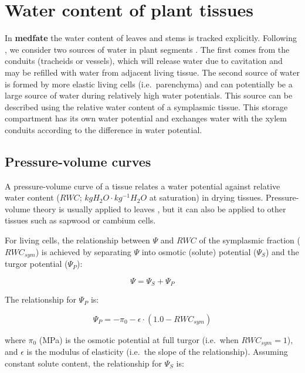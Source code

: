 \documentclass[]{book}
\begin{document}
\section{Water content of plant
tissues}\label{water-content-of-plant-tissues}

In \textbf{medfate} the water content of leaves and stems is tracked
explicitly. Following \citet{Martin-StPaul2017}, we consider two sources
of water in plant segments \citep{Tyree1990}. The first comes from the
conduits (tracheids or vessels), which will release water due to
cavitation and may be refilled with water from adjacent living tissue.
The second source of water is formed by more elastic living cells
(i.e.~parenchyma) and can potentially be a large source of water during
relatively high water potentials. This source can be described using the
relative water content of a symplasmic tissue. This storage compartment
has its own water potential and exchanges water with the xylem conduits
according to the difference in water potential.

\subsection{Pressure-volume curves}\label{pressure-volume-curves}

A pressure-volume curve of a tissue relates a water potential against
relative water content (\(RWC\); \(kg H_2O \cdot kg^{-1}H_2O\) at
saturation) in drying tissues. Pressure-volume theory is usually applied
to leaves \citep{Bartlett2012}, but it can also be applied to other
tissues such as sapwood or cambium cells.

For living cells, the relationship between \(\Psi\) and \(RWC\) of the
symplasmic fraction (\(RWC_{sym}\)) is achieved by separating \(\Psi\)
into osmotic (solute) potential (\(\Psi_{S}\)) and the turgor potential
(\(\Psi_{P}\)):

\begin{equation}
\Psi = \Psi_{S} + \Psi_{P}
\end{equation}

The relationship for \(\Psi_{P}\) is:

\begin{equation}
\Psi_{P} = -\pi_0 -\epsilon\cdot (1.0 - RWC_{sym})
\end{equation}

where \(\pi_0\) (MPa) is the osmotic potential at full turgor (i.e.~when
\(RWC_{sym} = 1\)), and \(\epsilon\) is the modulus of elasticity
(i.e.~the slope of the relationship). Assuming constant solute content,
the relationship for \(\Psi_{S}\) is:
\end{document}

